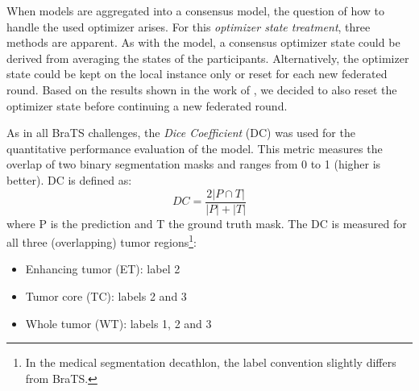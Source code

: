 When models are aggregated into a consensus model, the question of how to handle the used optimizer arises. For this \textit{optimizer state treatment}, three methods are apparent. As with the model, a consensus optimizer state could be derived from averaging the states of the participants. Alternatively, the optimizer state could be kept on the local instance only or reset for each new federated round. Based on the results shown in the work of \cite{Li2019Privacy-preservingSegmentation}, we decided to also reset the optimizer state before continuing a new federated round.

As in all BraTS challenges, the \textit{Dice Coefficient} (DC) was used for the quantitative performance evaluation of the model.
This metric measures the overlap of two binary segmentation masks and ranges from 0 to 1 (higher is better). DC is defined as:
\begin{equation}
DC=\frac{2 |P \cap T|}{|P| + |T|} \label{eq:dice}
\end{equation}
where P is the prediction and T the ground truth mask. The DC is measured for all three (overlapping) tumor regions\footnote{In the medical segmentation decathlon, the label convention slightly differs from BraTS.}:
\begin{itemize}
    \item Enhancing tumor (ET): label 2
    \item Tumor core (TC): labels 2 and 3
    \item Whole tumor (WT): labels 1, 2 and 3
\end{itemize}

